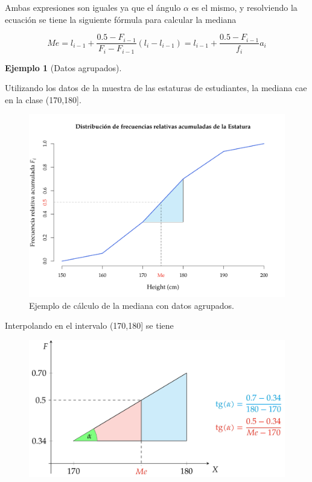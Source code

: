 \documentclass[
  a4paper,
]{scrreport}
\theoremstyle{plain}
\theoremstyle{definition}
\theoremstyle{definition}
\newtheorem{example}{Ejemplo}[chapter]
\theoremstyle{remark}
\begin{document}
Ambas expresiones son iguales ya que el ángulo \(\alpha\) es el mismo, y
resolviendo la ecuación se tiene la siguiente fórmula para calcular la
mediana

\[
Me=l_{i-1}+\frac{0.5-F_{i-1}}{F_i-F_{i-1}}(l_i-l_{i-1})=l_{i-1}+\frac{0.5-F_{i-1}}{f_i}a_i
\]

\begin{example}[Datos
agrupados]\protect\hypertarget{exm-mediana-datos-agrupados}{}\label{exm-mediana-datos-agrupados}

Utilizando los datos de la muestra de las estaturas de estudiantes, la
mediana cae en la clase (170,180{]}.

\begin{figure}[H]

{\centering \includegraphics{img/descriptiva/interpolacion_ejemplo_1.png}

}

\caption{Ejemplo de cálculo de la mediana con datos agrupados.}

\end{figure}%

Interpolando en el intervalo (170,180{]} se tiene

\begin{figure}[H]

{\centering \includegraphics{img/descriptiva/interpolacion_ejemplo_2.png}

}
\end{figure}
\end{example}
\end{document}
